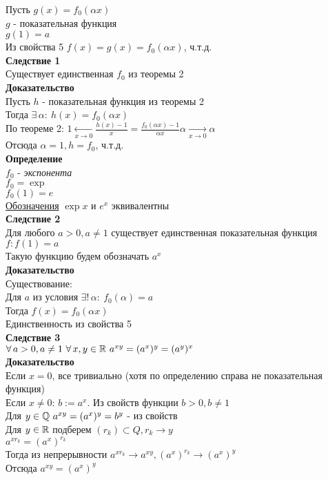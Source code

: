 \documentclass[12pt]{article}
\begin{document}
Пусть $g(x) = f_0(\alpha x)$\\
$g$ - показательная функция\\
$g(1) = a$\\
Из свойства 5 $f(x) = g(x) = f_0(\alpha x)$, ч.т.д.\\
\textbf{Следствие 1}\\
Существует единственная $f_0$ из теоремы 2\\
\textbf{Доказательство}\\
Пусть $h$ - показательная функция из теоремы 2\\
Тогда $\exists\,\alpha:\ h(x) = f_0(\alpha x)$\\
По теореме 2: $1 \xleftarrow[x\rightarrow 0]{} \frac{h(x)-1}{x} = \frac{f_0(\alpha x) -1}{\alpha x}\alpha \xrightarrow[x\rightarrow 0]{} \alpha$\\
Отсюда $\alpha = 1, h = f_0$, ч.т.д.\\
\textbf{Определение}\\
$f_0$ - \textit{экспонента}\\
$f_0 = \exp$\\
$f_0(1) = e$\\
\underline{Обозначения} $\exp x$ и $e^x$ эквивалентны\\
\textbf{Следствие 2}\\
Для любого $a > 0, a \neq 1$ существует единственная показательная функция $f: f(1) = a$\\
Такую функцию будем обозначать $a^x$\\
\textbf{Доказательство}\\
Существование:\\
Для $a$ из условия $\exists!\,\alpha:\ f_0(\alpha) = a$\\
Тогда $f(x) = f_0(\alpha x)$\\
Единственность из свойства 5\\
\textbf{Следствие 3}\\
$\forall\,a >0, a\neq 1\ \forall\,x,y \in \mathbb{R}\ a^{xy} = (a^x)^y = (a^y)^x$\\
\textbf{Доказательство}\\
Если $x = 0$, все тривиально (хотя по определению справа не показательная функция)\\
Если $x \neq 0$:
$b:= a^x$. Из свойств функции $b > 0, b \neq 1$\\
Для $y \in \mathbb{Q}\ a^{xy} = (a^x)^y = b^y$ - из свойств\\
Для $y\in \mathbb{R}$ подберем $(r_k) \subset Q, r_k \rightarrow y $\\
$a^{xr_k} = (a^x)^{r_k}$\\
Тогда из непрерывности $a^{xr_k} \rightarrow a^{xy}, (a^x)^{r_k} \rightarrow (a^x)^y$\\
Отсюда $a^{xy} = (a^x)^y$
\end{document}
